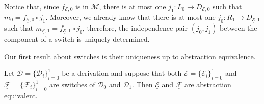 \documentclass[a4paper,UKenglish,cleveref,pdftex, thm-restate,numberwithinsect]{lipics}
\newcommand{\dder}[1]{\mathscr{#1}}
\newcommand{\der}[1]{\underline{\dder{#1}}}
\begin{document}
\begin{remark}\label{rem:fact}
	Notice that, since $f_{\der{E}, 0}$ is in $\mathcal{M}$, there is at most one $j_1\colon L_0\to D_{\der{E},0}$ such that $m_0=f_{\der{E}, 0} \circ j_1$. Moreover, we already know that there is at most one $j_0\colon R_1\to D_{\der{E},1}$ such that $m_{\der{E},1}=f_{\der{E},1}\circ j_0$, therefore, the independence pair $(j_0,j_1)$ between the component of a switch is uniquely determined.
\end{remark}

Our first result about switches is their uniqueness up to abstraction equivalence.

\begin{lemma}\label{thm:switch_uni} Let $\der{D}=\{\dder{D}_{i}\}_{i=0}^1$ be a derivation and suppose that both $\der{E}=\{\dder{E}_i\}_{i=0}^1$  and $\der{F}=\{\dder{F}_i\}_{i=0}^1$ are switches of $\dder{D}_0$ and $\dder{D}_1$. Then $\der{E}$ and $\der{F}$ are abstraction equivalent.
\end{lemma}
\end{document}
